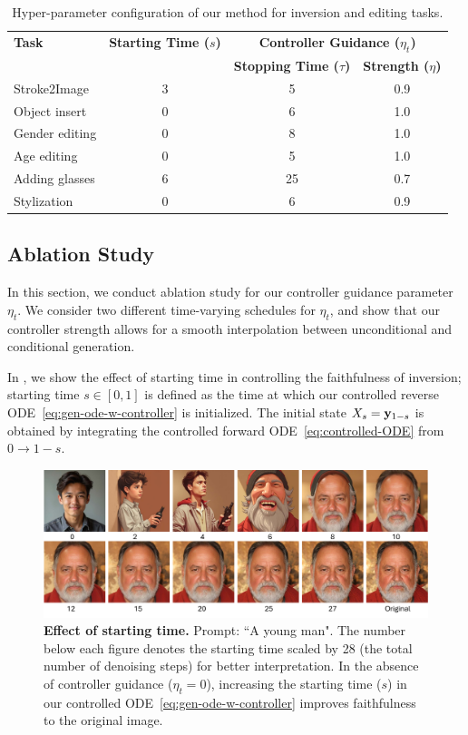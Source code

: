 \documentclass{article} %
\theoremstyle{plain}
\begin{document}
\begin{table}[!tbh]
\centering
\caption{
Hyper-parameter configuration of our method for inversion and editing tasks. 
}
\label{tab:hparam}
\begin{tabular}{lccc}
\toprule
\textbf{Task} & \textbf{Starting Time ($s$)} & \multicolumn{2}{c}{\textbf{Controller Guidance ($\eta_t$)}} \\
\cmidrule(lr){3-4}
 &  & \textbf{Stopping Time ($\tau$)} & \textbf{Strength ($\eta$)} \\
\midrule
Stroke2Image  & 3 & 5 & 0.9 \\
Object insert & 0 & 6 & 1.0 \\
Gender editing  & 0 & 8 & 1.0 \\
Age editing & 0 & 5 & 1.0 \\
Adding glasses & 6 & 25 & 0.7\\
Stylization & 0 & 6 & 0.9 \\
\bottomrule
\end{tabular}
\end{table}




\subsection{Ablation Study}
\label{sec:ablation}
In this section, we conduct ablation study for our controller guidance parameter $\eta_t$.
We consider two different time-varying schedules for $\eta_t$, and show that our controller strength allows for a smooth interpolation between unconditional and conditional generation.

In , we show the effect of starting time in controlling the faithfulness of inversion; starting time $s \in [0,1]$ is defined as the time at which our controlled reverse ODE~\eqref{eq:gen-ode-w-controller} is initialized. 
The initial state $X_s={\mathbf{y}}_{1-s}$ is obtained by integrating the controlled forward ODE~\eqref{eq:controlled-ODE} from $0 \rightarrow 1-s$.


\begin{figure}[!tbh]
\includegraphics[width=\linewidth]{pics/ablation-start-time_low.pdf}
\caption{
\textbf{Effect of starting time.} 
Prompt: ``A young man". 
The number below each figure denotes the starting time scaled by 28 (the total number of denoising steps) for better interpretation. 
In the absence of controller guidance ($\eta_t=0$), increasing the starting time ($s$) in our controlled ODE~\eqref{eq:gen-ode-w-controller} improves faithfulness to the original image.
}
\label{fig:abl-start-time}
\end{figure}
\end{document}
